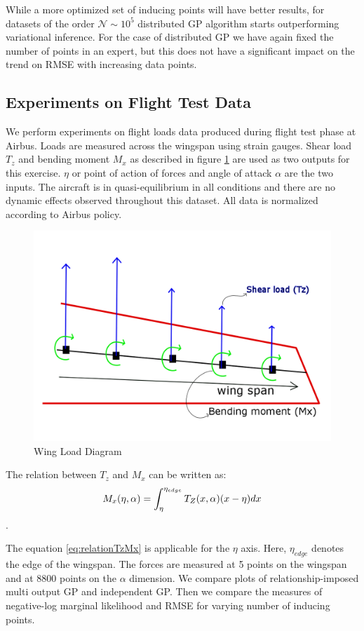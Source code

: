 While a more optimized set of inducing points will have better results, for datasets of the order $\mathcal{N} \sim 10^5$ distributed GP algorithm starts outperforming variational inference. For the case of distributed GP we have again fixed the number of points in an expert, but this does not have a significant impact on the trend on RMSE with increasing data points. 

\subsection{Experiments on Flight Test Data}\label{subsec:expFlightLoadsData}
We perform experiments on flight loads data produced during flight test phase at Airbus. Loads are measured across the wingspan using strain gauges. Shear load \(T_{z}\) and bending moment \(M_{x}\) as described in figure \ref{fig:wingLoadDiagram} are used as two outputs for this exercise. \(\eta\) or point of action of forces and angle of attack \(\alpha\) are the two inputs. The aircraft is in quasi-equilibrium in all conditions and there are no dynamic effects observed throughout this dataset. All data is normalized according to Airbus policy.

\begin{figure}
\centering
\includegraphics[width=0.5\columnwidth]{images/part3/wingLoadDiagram.png}
\caption{Wing Load Diagram}
\label{fig:wingLoadDiagram}
\end{figure}


The relation between \(T_{z}\) and \(M_{x}\) can be written as:
\begin{equation}\label{eq:relationTzMx}
\centering
M_{x}(\eta, \alpha) = \int_{\eta}^{\eta_{edge}} T_{Z}(x, \alpha)(x-\eta)dx
\end{equation}.

The equation \ref{eq:relationTzMx} is applicable for the \(\eta\) axis. Here, \(\eta_{edge}\) denotes the edge of the wingspan. The forces are measured at 5 points on the wingspan and at 8800 points on the \(\alpha\) dimension. We compare plots of relationship-imposed multi output GP and independent GP. Then we compare the measures of negative-log marginal likelihood and RMSE for varying number of inducing points.


